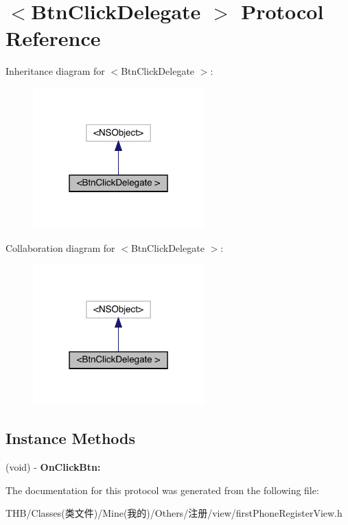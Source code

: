 \hypertarget{protocol_btn_click_delegate_01-p}{}\section{$<$Btn\+Click\+Delegate $>$ Protocol Reference}
\label{protocol_btn_click_delegate_01-p}


Inheritance diagram for $<$Btn\+Click\+Delegate $>$\+:\nopagebreak
\begin{figure}[H]
\begin{center}
\leavevmode
\includegraphics[width=187pt]{protocol_btn_click_delegate_01-p__inherit__graph}
\end{center}
\end{figure}


Collaboration diagram for $<$Btn\+Click\+Delegate $>$\+:\nopagebreak
\begin{figure}[H]
\begin{center}
\leavevmode
\includegraphics[width=187pt]{protocol_btn_click_delegate_01-p__coll__graph}
\end{center}
\end{figure}
\subsection*{Instance Methods}
\begin{DoxyCompactItemize}
\item 
\mbox{\label{protocol_btn_click_delegate_01-p_adbcd40842f5cb40d27b1914913be92df}} 
(void) -\/ {\bfseries On\+Click\+Btn\+:}
\end{DoxyCompactItemize}


The documentation for this protocol was generated from the following file\+:\begin{DoxyCompactItemize}
\item 
T\+H\+B/\+Classes(类文件)/\+Mine(我的)/\+Others/注册/view/first\+Phone\+Register\+View.\+h\end{DoxyCompactItemize}
